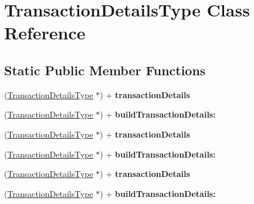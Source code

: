 \hypertarget{interface_transaction_details_type}{
\section{TransactionDetailsType Class Reference}
\label{interface_transaction_details_type}
}
\subsection*{Static Public Member Functions}
\begin{DoxyCompactItemize}
\item 
\hypertarget{interface_transaction_details_type_a3befc19402826243e380a46c41911620}{
(\hyperlink{interface_transaction_details_type}{TransactionDetailsType} $\ast$) + {\bfseries transactionDetails}}
\label{interface_transaction_details_type_a3befc19402826243e380a46c41911620}

\item 
\hypertarget{interface_transaction_details_type_ab7ff606497a621e7f6d6864cef365757}{
(\hyperlink{interface_transaction_details_type}{TransactionDetailsType} $\ast$) + {\bfseries buildTransactionDetails:}}
\label{interface_transaction_details_type_ab7ff606497a621e7f6d6864cef365757}

\item 
\hypertarget{interface_transaction_details_type_a3befc19402826243e380a46c41911620}{
(\hyperlink{interface_transaction_details_type}{TransactionDetailsType} $\ast$) + {\bfseries transactionDetails}}
\label{interface_transaction_details_type_a3befc19402826243e380a46c41911620}

\item 
\hypertarget{interface_transaction_details_type_ab7ff606497a621e7f6d6864cef365757}{
(\hyperlink{interface_transaction_details_type}{TransactionDetailsType} $\ast$) + {\bfseries buildTransactionDetails:}}
\label{interface_transaction_details_type_ab7ff606497a621e7f6d6864cef365757}

\item 
\hypertarget{interface_transaction_details_type_a3befc19402826243e380a46c41911620}{
(\hyperlink{interface_transaction_details_type}{TransactionDetailsType} $\ast$) + {\bfseries transactionDetails}}
\label{interface_transaction_details_type_a3befc19402826243e380a46c41911620}

\item 
\hypertarget{interface_transaction_details_type_ab7ff606497a621e7f6d6864cef365757}{
(\hyperlink{interface_transaction_details_type}{TransactionDetailsType} $\ast$) + {\bfseries buildTransactionDetails:}}
\label{interface_transaction_details_type_ab7ff606497a621e7f6d6864cef365757}

\end{DoxyCompactItemize}
